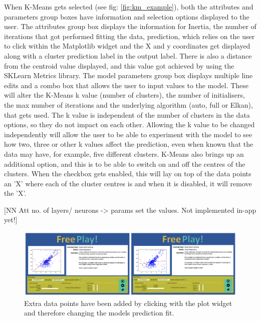 		When K-Means gets selected (see fig: \ref{fig:km_example}), both the attributes and parameters group boxes have information and selection options displayed to the user. The attributes group box displays the information for Inertia, the number of iterations that got performed fitting the data, prediction, which relies on the user to click within the Matplotlib widget and the X and y coordinates get displayed along with a cluster prediction label in the output label. There is also a distance from the centroid value displayed, and this value got achieved by using the SKLearn Metrics library. The model parameters group box displays multiple line edits and a combo box that allows the user to input values to the model. These will alter the K-Means k value (number of clusters), the number of initialisers, the max number of iterations and the underlying algorithm (auto, full or Elkan), that gets used.  The k value is independent of the number of clusters in the data options, so they do not impact on each other. Allowing the k value to be changed independently will allow the user to be able to experiment with the model to see how two, three or other k values affect the prediction, even when known that the data may have, for example, five different clusters. K-Means also brings up an additional option, and this is to be able to switch on and off the centres of the clusters. When the checkbox gets enabled, this will lay on top of the data points an 'X' where each of the cluster centres is and when it is disabled, it will remove the 'X'.
		
	
		[NN Att no. of layers/ neurons -> params set the values. Not implemented in-app yet!]
		
		\begin{figure}[t]
			\begin{center}
				\includegraphics[width=13cm]{graphics/manipulating_lr_data.png}
				\caption{Extra data points have been added by clicking with the plot widget and therefore changing the models prediction fit.}
				\label{fig:manipulating_lr_data}
			\end{center}
		\end{figure}
	
